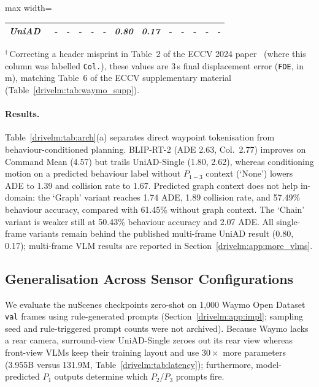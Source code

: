\begin{table}[!tp]
\begin{adjustbox}{max width=\textwidth}
\begin{tabular}{l|cc|ccc|cc|ccc|cc}
    \midrule
    \textit{UniAD}~\cite{hu2023uniad} & \textit{-} & \textit{-} & \textit{-} & \textit{-} & \textit{-} & \textit{0.80} & \textit{0.17} & \textit{-} & \textit{-} & \textit{-} & \textit{-} & \textit{-} \\
    \bottomrule
  \end{tabular}
  \end{adjustbox}
  \par\smallskip
  {\linespread{1.1}\footnotesize\raggedright
  $^{\dagger}$\,Correcting a header misprint in Table~2 of the ECCV 2024 paper~\cite{sima2024drivelm} (where this column was labelled \texttt{Col.}), these values are 3\,s final displacement error (\texttt{FDE}, in m), matching Table~6 of the ECCV supplementary material (Table~\ref{drivelm:tab:waymo_supp}).\par}
\end{table}

\paragraph{Results.}
Table~\ref{drivelm:tab:arch}(a) separates direct waypoint tokenisation from behaviour-conditioned planning. BLIP-RT-2 (ADE 2.63, Col.\ 2.77) improves on Command Mean (4.57) but trails UniAD-Single (1.80, 2.62), whereas conditioning motion on a predicted behaviour label without $P_{1-3}$ context (`None') lowers ADE to 1.39 and collision rate to 1.67. Predicted graph context does not help in-domain: the `Graph' variant reaches 1.74 ADE, 1.89 collision rate, and 57.49\% behaviour accuracy, compared with 61.45\% without graph context. The `Chain' variant is weaker still at 50.43\% behaviour accuracy and 2.07 ADE. All single-frame variants remain behind the published multi-frame UniAD result (0.80, 0.17); multi-frame VLM results are reported in Section~\ref{drivelm:app:more_vlms}.

\subsection{Generalisation Across Sensor Configurations}\label{drivelm:sec:exp_waymo}

We evaluate the nuScenes checkpoints zero-shot on 1,000 Waymo Open Dataset~\cite{sun2020waymo} \texttt{val} frames using rule-generated prompts (Section~\ref{drivelm:app:impl}; sampling seed and rule-triggered prompt counts were not archived). Because Waymo lacks a rear camera, surround-view UniAD-Single zeroes out its rear view whereas front-view VLMs keep their training layout and use $30\times$ more parameters (3.955B versus 131.9M, Table~\ref{drivelm:tab:latency}); furthermore, model-predicted $P_1$ outputs determine which $P_2$/$P_3$ prompts fire.

